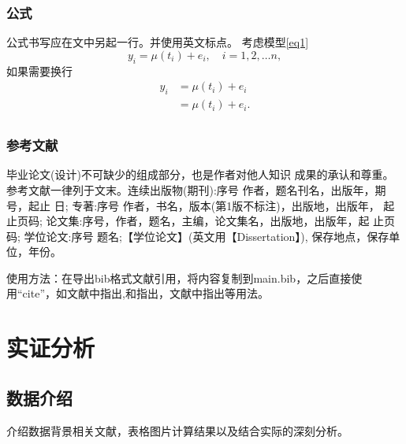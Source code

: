 \documentclass{SUFEThesis}
\begin{document}
\subsubsection{公式}
公式书写应在文中另起一行。并使用英文标点。
考虑模型\eqref{eq1}
\begin{equation}
  y_i = \mu(t_i) + e_i, \quad i = 1,2,\dots n,
  \label{eq1}
\end{equation}
如果需要换行
\begin{equation}
  \begin{aligned}
    y_i & = \mu(t_i) + e_i  \\
        & = \mu(t_i) + e_i. \\
  \end{aligned}
\end{equation}

\subsubsection{参考文献}
毕业论文(设计)不可缺少的组成部分，也是作者对他人知识
成果的承认和尊重。参考文献一律列于文末。连续出版物(期刊):序号 作者，题名刊名，出版年，期号，起止 日;
专著:序号 作者，书名，版本(第1版不标注)，出版地，出版年， 起止页码; 论文集:序号，作者，题名，主编，论文集名，出版地，出版年，起 止页码;
学位论文:序号 题名;【学位论文】(英文用【Dissertation】),
保存地点，保存单位，年份。\par
使用方法：在导出bib格式文献引用，将内容复制到main.bib，之后直接使用“cite”，如文献中指出\cite{guegan2005can},\citet{guegan2005can}和\citet{dahlhaus1997}指出，文献中指出\cite{guegan2005can,dahlhaus1997}等用法。


\section{实证分析}
\subsection{数据介绍}
介绍数据背景相关文献，表格图片计算结果以及结合实际的深刻分析。

\end{document}
